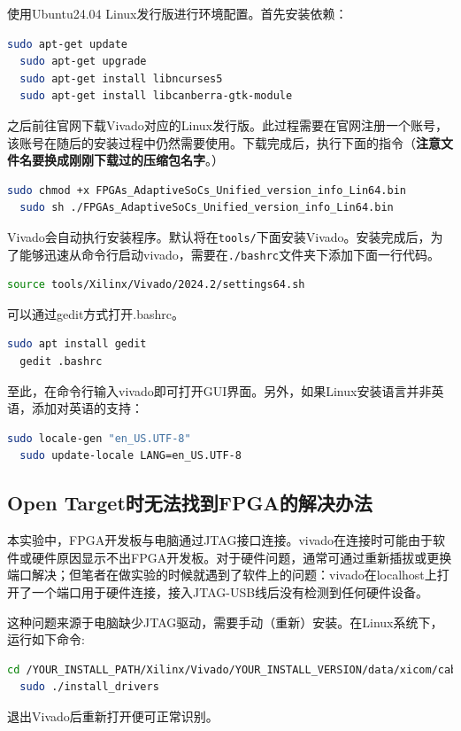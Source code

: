 使用Ubuntu24.04 Linux发行版进行环境配置。首先安装依赖：
\begin{lstlisting}[language=bash]
  sudo apt-get update
  sudo apt-get upgrade
  sudo apt-get install libncurses5
  sudo apt-get install libcanberra-gtk-module  
\end{lstlisting}

之后前往官网下载Vivado对应的Linux发行版。此过程需要在官网注册一个账号，该账号在随后的安装过程中仍然需要使用。下载完成后，执行下面的指令（\textbf{注意文件名要换成刚刚下载过的压缩包名字}。）
\begin{lstlisting}[language=bash]
  sudo chmod +x FPGAs_AdaptiveSoCs_Unified_version_info_Lin64.bin
  sudo sh ./FPGAs_AdaptiveSoCs_Unified_version_info_Lin64.bin
\end{lstlisting}

Vivado会自动执行安装程序。默认将在\texttt{tools/}下面安装Vivado。安装完成后，为了能够迅速从命令行启动vivado，需要在\texttt{./bashrc}文件夹下添加下面一行代码。
\begin{lstlisting}[language=bash]
  source tools/Xilinx/Vivado/2024.2/settings64.sh
\end{lstlisting}

可以通过gedit方式打开.bashrc。
\begin{lstlisting}[language=bash]
  sudo apt install gedit
  gedit .bashrc
\end{lstlisting}

至此，在命令行输入vivado即可打开GUI界面。另外，如果Linux安装语言并非英语，添加对英语的支持：
\begin{lstlisting}[language=bash]
  sudo locale-gen "en_US.UTF-8"
  sudo update-locale LANG=en_US.UTF-8
\end{lstlisting}

\subsection{Open Target时无法找到FPGA的解决办法}
本实验中，FPGA开发板与电脑通过JTAG接口连接。vivado在连接时可能由于软件或硬件原因显示不出FPGA开发板。对于硬件问题，通常可通过重新插拔或更换端口解决；但笔者在做实验的时候就遇到了软件上的问题：vivado在localhost上打开了一个端口用于硬件连接，接入JTAG-USB线后没有检测到任何硬件设备。

这种问题来源于电脑缺少JTAG驱动，需要手动（重新）安装。在Linux系统下，运行如下命令:
\begin{lstlisting}[language=bash]
  cd /YOUR_INSTALL_PATH/Xilinx/Vivado/YOUR_INSTALL_VERSION/data/xicom/cable_drivers/lin64/install_script/install_drivers
  sudo ./install_drivers
\end{lstlisting}

退出Vivado后重新打开便可正常识别。

